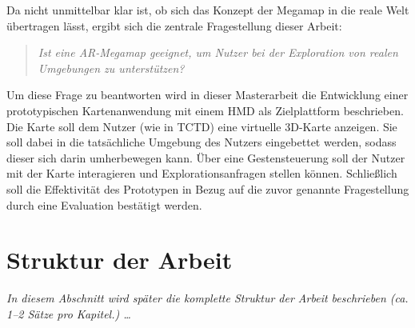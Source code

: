 Da nicht unmittelbar klar ist, ob sich das Konzept der Megamap in die reale Welt übertragen lässt, ergibt sich die zentrale Fragestellung dieser Arbeit:
\begin{quote}
\itshape
Ist eine AR-Megamap geeignet, um Nutzer bei der Exploration von \emph{realen} Umgebungen zu unterstützen?
\end{quote}
Um diese Frage zu beantworten wird in dieser Masterarbeit die Entwicklung einer prototypischen Kartenanwendung mit einem HMD als Zielplattform beschrieben.
Die Karte soll dem Nutzer (wie in TCTD) eine virtuelle 3D-Karte anzeigen.
Sie soll dabei in die tatsächliche Umgebung des Nutzers eingebettet werden, sodass dieser sich darin umherbewegen kann.
Über eine Gestensteuerung soll der Nutzer mit der Karte interagieren und Explorationsanfragen stellen können.
Schließlich soll die Effektivität des Prototypen in Bezug auf die zuvor genannte Fragestellung durch eine Evaluation bestätigt werden.

\section{Struktur der Arbeit}
\label{sec:struktur}
{\itshape In diesem Abschnitt wird später die komplette Struktur der Arbeit beschrieben (ca. 1--2 Sätze pro Kapitel.) \dots}

%
\cleardoublepage
